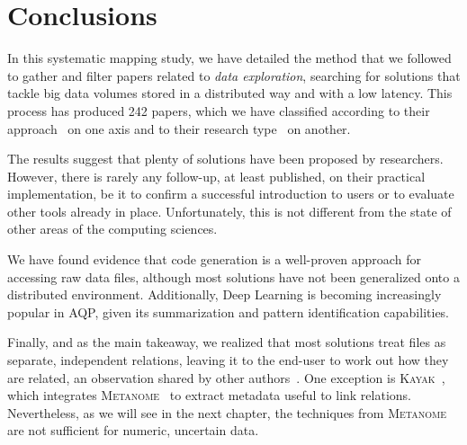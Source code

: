 \section{Conclusions}
\label{sec:conclusions}
In this systematic mapping study, we have detailed the method that we followed
to gather and filter papers related to \emph{data exploration}, searching
for solutions that tackle big data volumes stored in a distributed way and with
a low latency. This process has produced 242 papers, which we have classified
according to their approach~\cite{Idreos2015} on one axis and to their research
type~\cite{Wieringa2006} on another.

The results suggest that  plenty of solutions have been proposed by researchers.
However, there is rarely any follow-up, at least published, on their
practical implementation, be it to confirm a successful introduction to users
or to evaluate other tools already in place.
Unfortunately, this is not different from the state of other areas of the computing sciences.

We have found evidence that code generation is a well-proven approach for
accessing raw data files, although most solutions have not been generalized
onto a distributed environment. Additionally, Deep Learning is becoming increasingly
popular in \gls{AQP}, given its summarization and pattern identification capabilities.

Finally, and as the main takeaway, we realized that most solutions treat files as separate,
independent relations, leaving it to the end-user to work out how they are related,
an observation shared by other authors~\cite{Silva2016}. One exception is
\textsc{Kayak}~\cite{maccioni_crossing_2017}, which integrates \textsc{Metanome}~\cite{papenbrock2015data}
to extract metadata useful to link relations. Nevertheless, as we will see in the next chapter,
the techniques from \textsc{Metanome} are not sufficient for numeric, uncertain data.
